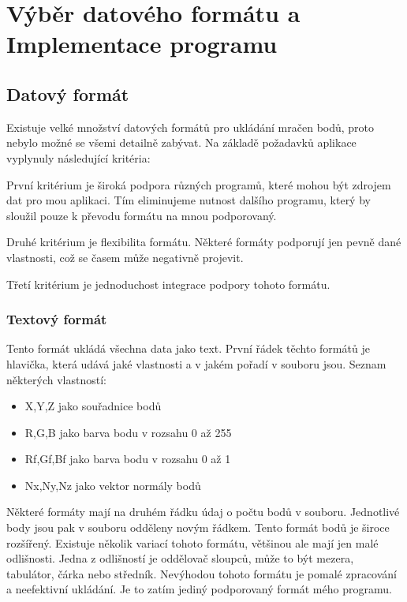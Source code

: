 \chapter{Výběr datového formátu a Implementace programu}

\section{Datový formát}

Existuje velké množství datových formátů pro ukládání mračen bodů, proto nebylo možné se všemi detailně zabývat. Na základě požadavků aplikace vyplynuly následující kritéria:

První kritérium je široká podpora různých programů, které mohou být zdrojem dat pro mou aplikaci. Tím eliminujeme nutnost dalšího programu, který by sloužil pouze k převodu formátu na mnou podporovaný. 

Druhé kritérium je flexibilita formátu. Některé formáty podporují jen pevně dané vlastnosti, což se časem může negativně projevit. 

Třetí kritérium je jednoduchost integrace podpory tohoto formátu. 

\subsection{Textový formát}

Tento formát ukládá všechna data jako text. První řádek těchto formátů je hlavička, která udává jaké vlastnosti a v jakém pořadí v souboru jsou.
Seznam některých vlastností:

\begin{itemize}
	\item X,Y,Z jako souřadnice bodů
	\item R,G,B jako barva bodu v rozsahu 0 až 255
	\item Rf,Gf,Bf jako barva bodu v rozsahu 0 až 1
	\item Nx,Ny,Nz jako vektor normály bodů
\end{itemize}

Některé formáty mají na druhém řádku údaj o počtu bodů v souboru. Jednotlivé body jsou pak v souboru odděleny novým řádkem. Tento formát bodů je široce rozšířený. Existuje několik variací tohoto formátu, většinou ale mají jen malé odlišnosti. Jedna z odlišností je oddělovač sloupců, může to být mezera, tabulátor, čárka nebo středník.  Nevýhodou tohoto formátu je pomalé zpracování a neefektivní ukládání. Je to zatím jediný podporovaný formát mého programu.


